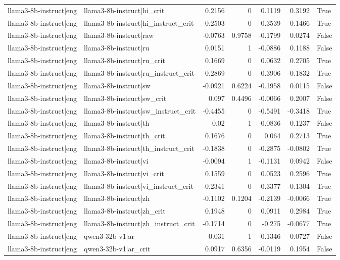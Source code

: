 \begin{table}
\begin{tabular}{l l r r r r l}
llama3-8b-instruct|eng & llama3-8b-instruct|hi_crit & 0.2156 & 0 & 0.1119 & 0.3192 & True \\
llama3-8b-instruct|eng & llama3-8b-instruct|hi_instruct_crit & -0.2503 & 0 & -0.3539 & -0.1466 & True \\
llama3-8b-instruct|eng & llama3-8b-instruct|raw & -0.0763 & 0.9758 & -0.1799 & 0.0274 & False \\
llama3-8b-instruct|eng & llama3-8b-instruct|ru & 0.0151 & 1 & -0.0886 & 0.1188 & False \\
llama3-8b-instruct|eng & llama3-8b-instruct|ru_crit & 0.1669 & 0 & 0.0632 & 0.2705 & True \\
llama3-8b-instruct|eng & llama3-8b-instruct|ru_instruct_crit & -0.2869 & 0 & -0.3906 & -0.1832 & True \\
llama3-8b-instruct|eng & llama3-8b-instruct|sw & -0.0921 & 0.6224 & -0.1958 & 0.0115 & False \\
llama3-8b-instruct|eng & llama3-8b-instruct|sw_crit & 0.097 & 0.4496 & -0.0066 & 0.2007 & False \\
llama3-8b-instruct|eng & llama3-8b-instruct|sw_instruct_crit & -0.4455 & 0 & -0.5491 & -0.3418 & True \\
llama3-8b-instruct|eng & llama3-8b-instruct|th & 0.02 & 1 & -0.0836 & 0.1237 & False \\
llama3-8b-instruct|eng & llama3-8b-instruct|th_crit & 0.1676 & 0 & 0.064 & 0.2713 & True \\
llama3-8b-instruct|eng & llama3-8b-instruct|th_instruct_crit & -0.1838 & 0 & -0.2875 & -0.0802 & True \\
llama3-8b-instruct|eng & llama3-8b-instruct|vi & -0.0094 & 1 & -0.1131 & 0.0942 & False \\
llama3-8b-instruct|eng & llama3-8b-instruct|vi_crit & 0.1559 & 0 & 0.0523 & 0.2596 & True \\
llama3-8b-instruct|eng & llama3-8b-instruct|vi_instruct_crit & -0.2341 & 0 & -0.3377 & -0.1304 & True \\
llama3-8b-instruct|eng & llama3-8b-instruct|zh & -0.1102 & 0.1204 & -0.2139 & -0.0066 & True \\
llama3-8b-instruct|eng & llama3-8b-instruct|zh_crit & 0.1948 & 0 & 0.0911 & 0.2984 & True \\
llama3-8b-instruct|eng & llama3-8b-instruct|zh_instruct_crit & -0.1714 & 0 & -0.275 & -0.0677 & True \\
llama3-8b-instruct|eng & qwen3-32b-v1|ar & -0.031 & 1 & -0.1346 & 0.0727 & False \\
llama3-8b-instruct|eng & qwen3-32b-v1|ar_crit & 0.0917 & 0.6356 & -0.0119 & 0.1954 & False \\

\end{tabular}
\end{table}
